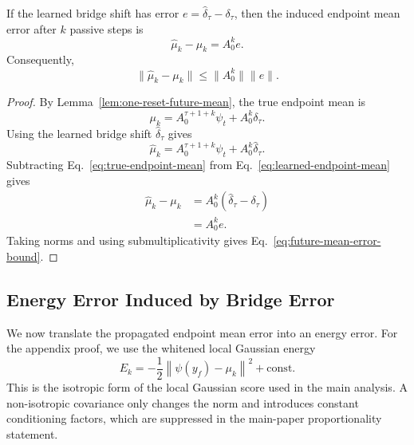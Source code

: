 \begin{lemma}
\label{lem:propagated-bridge-error}
If the learned bridge shift has error $e=\widehat{\delta}_\tau-\delta_\tau$, then the induced endpoint
mean error after $k$ passive steps is
\begin{equation}
    \widehat{\mu}_k-\mu_k
    =
    A_0^k e .
    \label{eq:future-mean-error}
\end{equation}
Consequently,
\begin{equation}
    \|\widehat{\mu}_k-\mu_k\|
    \le
    \|A_0^k\|\|e\|.
    \label{eq:future-mean-error-bound}
\end{equation}
\end{lemma}

\begin{proof}
By Lemma~\ref{lem:one-reset-future-mean}, the true endpoint mean is
\begin{equation}
    \mu_k
    =
    A_0^{\tau+1+k}\psi_t
    +
    A_0^k\delta_\tau .
    \label{eq:true-endpoint-mean}
\end{equation}
Using the learned bridge shift $\widehat{\delta}_\tau$ gives
\begin{equation}
    \widehat{\mu}_k
    =
    A_0^{\tau+1+k}\psi_t
    +
    A_0^k\widehat{\delta}_\tau .
    \label{eq:learned-endpoint-mean}
\end{equation}
Subtracting Eq.~\eqref{eq:true-endpoint-mean} from Eq.~\eqref{eq:learned-endpoint-mean} gives
\begin{align}
    \widehat{\mu}_k-\mu_k
    &=
    A_0^k
    \left(
        \widehat{\delta}_\tau-\delta_\tau
    \right) \\
    &=
    A_0^k e .
\end{align}
Taking norms and using submultiplicativity gives Eq.~\eqref{eq:future-mean-error-bound}.
\end{proof}

\subsection{Energy Error Induced by Bridge Error}

We now translate the propagated endpoint mean error into an energy error.
For the appendix proof, we use the whitened local Gaussian energy
\begin{equation}
    E_k
    =
    -\frac{1}{2}
    \left\|
        \psi(y_f)-\mu_k
    \right\|^2
    +
    \mathrm{const}.
    \label{eq:gaussian-energy-appendix}
\end{equation}
This is the isotropic form of the local Gaussian score used in the main analysis.
A non-isotropic covariance only changes the norm and introduces constant conditioning factors, which
are suppressed in the main-paper proportionality statement.

